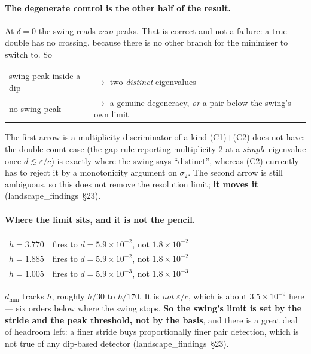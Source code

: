 \documentclass[11pt]{article}
\newcommand{\lf}[1]{(landscape\_findings~\S#1)}
\newcommand{\sig}{\sigma}
\newcommand{\sitwo}{\sig_2}
\begin{document}
\paragraph{The degenerate control is the other half of the result.} At $\delta = 0$ the swing
reads \emph{zero} peaks. That is correct and not a failure: a true double has no crossing, because
there is no other branch for the minimiser to switch to. So
\begin{center}
\begin{tabular}{l@{\ }l}
\toprule
swing peak inside a dip & $\to$ two \emph{distinct} eigenvalues \\
no swing peak           & $\to$ a genuine degeneracy, \emph{or} a pair below the swing's own limit \\
\bottomrule
\end{tabular}
\end{center}
The first arrow is a multiplicity discriminator of a kind (C1)$+$(C2) does not have: the
double-count case (the gap rule reporting multiplicity 2 at a \emph{simple} eigenvalue once
$d \lesssim \varepsilon/c$) is exactly where the swing says ``distinct'', whereas (C2) currently
has to reject it by a monotonicity argument on $\sitwo$. The second arrow is still ambiguous, so
this does not remove the resolution limit; \textbf{it moves it} \lf{23}.

\paragraph{Where the limit sits, and it is not the pencil.}
\begin{center}
\begin{tabular}{ll}
\toprule
$h = 3.770$ & fires to $d = 5.9\times10^{-2}$, not $1.8\times10^{-2}$ \\
$h = 1.885$ & fires to $d = 5.9\times10^{-2}$, not $1.8\times10^{-2}$ \\
$h = 1.005$ & fires to $d = 5.9\times10^{-3}$, not $1.8\times10^{-3}$ \\
\bottomrule
\end{tabular}
\end{center}
$d_{\min}$ tracks $h$, roughly $h/30$ to $h/170$. It is \emph{not} $\varepsilon/c$, which is about
$3.5\times10^{-9}$ here --- six orders below where the swing stops. \textbf{So the swing's limit is
set by the stride and the peak threshold, not by the basis}, and there is a great deal of headroom
left: a finer stride buys proportionally finer pair detection, which is not true of any dip-based
detector \lf{23}.
\end{document}
